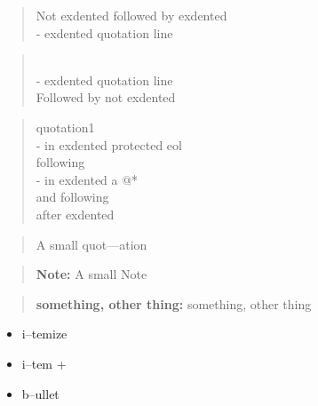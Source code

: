 \documentclass{book}
\begin{document}
\begin{quote}
Not exdented followed by exdented
\\
\hbox{\kern -\leftmargin}%
exdented quotation line
\\
\end{quote}

\begin{quote}
\\
\hbox{\kern -\leftmargin}%
exdented quotation line
\\
Followed by not exdented 
\end{quote}

\begin{quote}
quotation1
\\
\hbox{\kern -\leftmargin}%
in exdented protected eol \ {}
\\
following
\\
\hbox{\kern -\leftmargin}%
in exdented a @* \leavevmode{}\\ and following
\\
after exdented
\end{quote}

\begin{quote}
\begin{footnotesize}
A small quot---ation
\end{footnotesize}
\end{quote}

\begin{quote}
\begin{footnotesize}
\textbf{Note:} A small Note
\end{footnotesize}
\end{quote}

\begin{quote}
\begin{footnotesize}
\textbf{something, other thing:} something, other thing
\end{footnotesize}
\end{quote}

\begin{itemize}
\item i--temize
\end{itemize}

\begin{itemize}[label=+]
\item i--tem +
\end{itemize}

\begin{itemize}[label=\textbullet{}]
\item b--ullet
\end{itemize}
\end{document}
